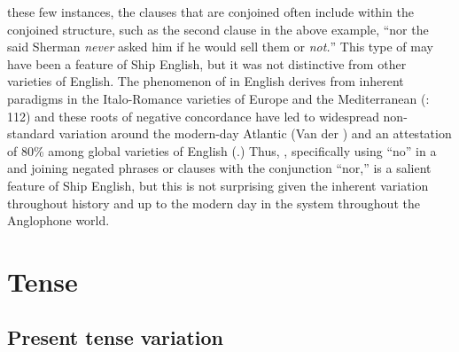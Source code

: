 these few instances, the clauses that are conjoined often include  within the conjoined structure, such as the second clause in the above example, “nor the said Sherman \textit{never} asked him if he would sell them or \textit{not.}” This type of  may have been a feature of Ship English, but it was not distinctive from other varieties of English. The phenomenon of  in English derives from inherent  paradigms in the Italo-Romance varieties of Europe and the Mediterranean (\citealt{WillisEtAl2013}: 112) and these roots of negative concordance have led to widespread non-standard variation around the modern-day Atlantic (Van der \citealt{Auwera2016}) and an attestation of 80\%  among global varieties of English (\citealt{KortmannLunkenheimer2013}.) Thus, , specifically using “no” in a  and joining negated phrases or clauses with the conjunction “nor,” is a salient feature of Ship English, but this is not surprising given the inherent variation throughout history and up to the modern day in the  system throughout the Anglophone world.  

\section{{Tense}}%

\subsection{{Present} {tense} {variation} }%

